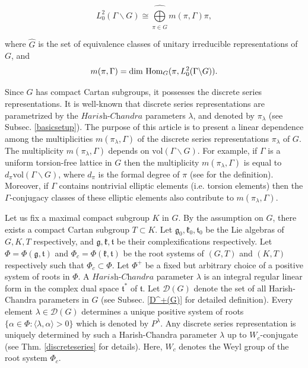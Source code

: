 \documentclass[11 pt]{amsart}
\newcommand{\Hom}{{\rm Hom}}
\theoremstyle{definition}
\numberwithin{equation}{section}
\begin{document}
$$ L^2_{0}(\Gamma \backslash G)\cong \widehat{\bigoplus\limits_{\pi \in \widehat{G}}} m(\pi , \Gamma) \pi, $$

\noindent where $\widehat{G}$ is the set of equivalence classes of unitary irreducible representations of $G$, and $$m(\pi, \Gamma)=\text{dim}\ \Hom_G(\pi, L^2_{0}(\Gamma \backslash G)).$$

\noindent Since $G$ has compact Cartan subgroups, it possesses the discrete series representations. It is well-known that discrete series representations are parametrized by the $\textit{Harish-Chandra}$ parameters $\lambda$, and denoted by $\pi_{\lambda}$ (see Subsec. \ref{basicsetup}). The purpose of this article is to present a linear dependence among the multiplicities $m(\pi_{\lambda}, \Gamma)$ of the discrete series representations $\pi_{\lambda}$ of $G$. The multiplicity $m(\pi_{\lambda}, \Gamma)$ depends on $\text{vol} (\Gamma \backslash G)$. For example, if $\Gamma$ is a uniform torsion-free lattice in $G$ then the multiplicity $m(\pi_{\lambda}, \Gamma)$ is equal to $d_{\pi} \text{vol} (\Gamma \backslash G)$, where $d_{\pi}$ is the formal degree of $\pi$ (see \cite{kn} for the definition). Moreover, if $\Gamma$ contains nontrivial elliptic elements (i.e. torsion elements) then the $\Gamma$-conjugacy classes of these elliptic elements also contribute to $m(\pi_{\lambda}, \Gamma)$.

\vspace{5pt}

 Let us fix a maximal compact subgroup $K$ in $G$. By the assumption on $G$, there exists a compact Cartan subgroup $T \subset K$. Let $\mathfrak{g}_0, \mathfrak{k}_0, \mathfrak{t}_0$ be the Lie algebras of $G, K, T$ respectively, and  $\mathfrak{g}, \mathfrak{k}, \mathfrak{t}$ be their complexifications respectively. Let $\Phi=\Phi(\mathfrak{g}, \mathfrak{t})$ and $\Phi_c=\Phi(\mathfrak{k}, \mathfrak{t})$ be the root systems of $(G, T)$ and $(K, T)$ respectively such that $\Phi_c \subset \Phi$. Let $\Phi^+$ be a fixed but arbitrary choice of a positive system of roots in $\Phi$. A $\textit{Harish-Chandra}$ parameter $\lambda$ is an integral regular linear form in the complex dual space $\mathfrak{t}^*$ of $\mathfrak{t}$. Let $\mathcal{D}(G)$ denote the set of all Harish-Chandra parameters in $G$ (see Subsec. \ref{D^+(G)} for detailed definition). Every element $\lambda \in \mathcal{D}(G)$ determines a unique positive system of roots $\{ \alpha \in \Phi: \langle \lambda , \alpha \rangle > 0 \}$ which is denoted by $P^{\lambda}$. Any discrete series representation is uniquely determined by such a Harish-Chandra parameter $\lambda$ up to $W_c$-conjugate (see Thm. \ref{discreteseries} for details). Here, $W_c$ denotes the Weyl group of the root system $\Phi_c$.  
 
\end{document}
